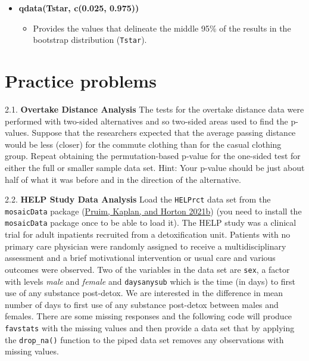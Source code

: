 \documentclass[
]{book}
\providecommand{\tightlist}{%
  \setlength{\itemsep}{0pt}\setlength{\parskip}{0pt}}
\begin{document}
\newpage

\begin{itemize}
\item
  \textbf{qdata(Tstar, c(0.025, 0.975))}

  \begin{itemize}
  \tightlist
  \item
    Provides the values that delineate the middle 95\% of the results in the
    bootstrap distribution (\texttt{Tstar}). 
  \end{itemize}
\end{itemize}

\hypertarget{section2-13}{%
\section{Practice problems}\label{section2-13}}

2.1. \textbf{Overtake Distance Analysis} The tests for the overtake distance data were performed with two-sided alternatives and so two-sided areas used to find the p-values. Suppose that the researchers expected that the average passing distance would be less (closer) for the commute clothing than for the casual clothing group. Repeat obtaining the permutation-based p-value for the one-sided test for either the full or smaller sample data set. Hint: Your p-value should be just about half of what it was before and in the direction of the alternative.

\vspace{11pt}

2.2. \textbf{HELP Study Data Analysis} Load the \texttt{HELPrct} data set from the \texttt{mosaicData} package (\protect\hyperlink{ref-R-mosaicData}{Pruim, Kaplan, and Horton 2021b})
(you need to
install the \texttt{mosaicData} package once to be able to load it). The HELP study
was a clinical trial for adult inpatients recruited from a
detoxification unit. Patients with no primary care physician were randomly
assigned to receive a multidisciplinary assessment and a brief motivational
intervention or usual care and various outcomes were observed. Two of the
variables in the data set are \texttt{sex}, a factor with levels \emph{male} and \emph{female}
and \texttt{daysanysub} which is the time (in days) to first use of any substance
post-detox. We are interested in the difference in mean number of days to first
use of any substance post-detox between males and females. There are some
missing responses and the following code will produce \texttt{favstats} with the
missing values and then provide a data set that by
applying the \texttt{drop\_na()} function to the piped data set removes any observations with missing values.  
\end{document}
